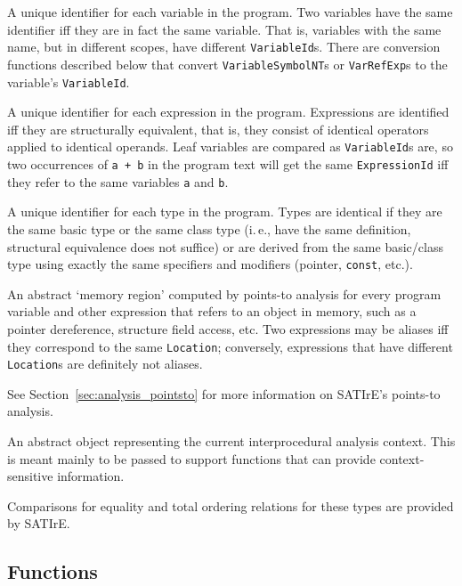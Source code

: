\documentclass[a4paper,12pt]{report}
\begin{document}
\begin{description}
    A unique identifier for each variable in the program. Two variables have
    the same identifier iff they are in fact the same variable. That is,
    variables with the same name, but in different scopes, have different
    \texttt{VariableId}s. There are conversion functions described below
    that convert \texttt{VariableSymbolNT}s or \texttt{VarRefExp}s to the
    variable's \texttt{VariableId}.

    A unique identifier for each expression in the program. Expressions are
    identified iff they are structurally equivalent, that is, they consist
    of identical operators applied to identical operands. Leaf variables are
    compared as \texttt{VariableId}s are, so two occurrences of \verb|a + b|
    in the program text will get the same \texttt{ExpressionId} iff they
    refer to the same variables \texttt{a} and \texttt{b}.

    A unique identifier for each type in the program. Types are identical if
    they are the same basic type or the same class type (i.\,e., have the
    same definition, structural equivalence does not suffice) or are derived
    from the same basic/class type using exactly the same specifiers and
    modifiers (pointer, \texttt{const}, etc.).

    An abstract `memory region' computed by points-to analysis for every
    program variable and other expression that refers to an object in
    memory, such as a pointer dereference, structure field access, etc. Two
    expressions may be aliases iff they correspond to the same
    \texttt{Location}; conversely, expressions that have different
    \texttt{Location}s are definitely not aliases.

    See Section~\ref{sec:analysis_pointsto} for more information on SATIrE's
    points-to analysis.

    An abstract object representing the current interprocedural analysis
    context. This is meant mainly to be passed to support functions that can
    provide context-sensitive information.
\end{description}

Comparisons for equality and total ordering relations for these types are
provided by SATIrE.

\subsection{Functions}
\label{sec:support_functions}
\end{document}
